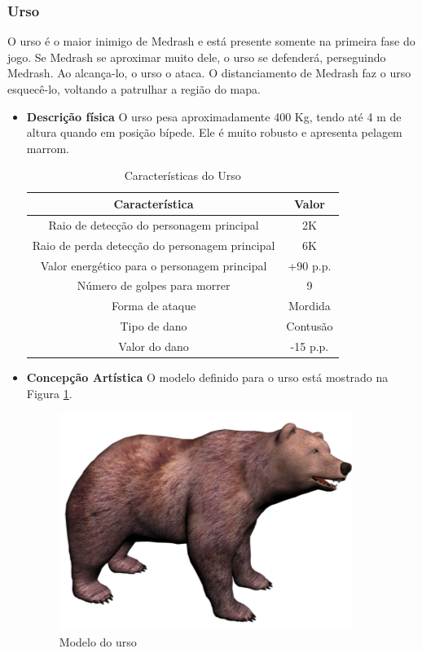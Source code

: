 \subsubsection{Urso}
O urso é o maior inimigo de Medrash e está presente somente na primeira
 fase do jogo. Se Medrash se aproximar muito dele, o urso se defenderá,
 perseguindo Medrash. Ao alcança-lo, o urso o ataca. O distanciamento de
 Medrash faz o urso esquecê-lo, voltando a patrulhar a região do mapa.
\begin{itemize}
\item {\bf Descrição física}
O urso pesa aproximadamente 400 Kg, tendo até 4 m de altura quando em
 posição bípede. Ele é muito robusto e apresenta pelagem marrom.


\begin{table}[H]
\begin{center}
\begin{tabular}{|c|c|}
\hline 
\textbf{Característica} & \textbf{Valor} \\ 
\hline 
Raio de detecção do personagem principal & 2K \\ 
\hline 
Raio de perda detecção do personagem principal & 6K \\ 
\hline 
Valor energético para o personagem principal & +90 p.p. \\ 
\hline 
Número de golpes para morrer & 9 \\ 
\hline 
Forma de ataque & Mordida \\ 
\hline 
Tipo de dano & Contusão \\ 
\hline 
Valor do dano & -15 p.p. \\ 
\hline 
\end{tabular} 
\caption{Características do Urso}
\end{center}
\end{table}


\item {\bf Concepção Artística}
O modelo definido para o urso está mostrado na Figura \ref{img:urso}.

\begin{figure}[H]
 \centering
 \includegraphics[scale=0.8]{Imagens/urso01.png}
 \caption{Modelo do urso}
\label{img:urso}
\end{figure}


\end{itemize}
